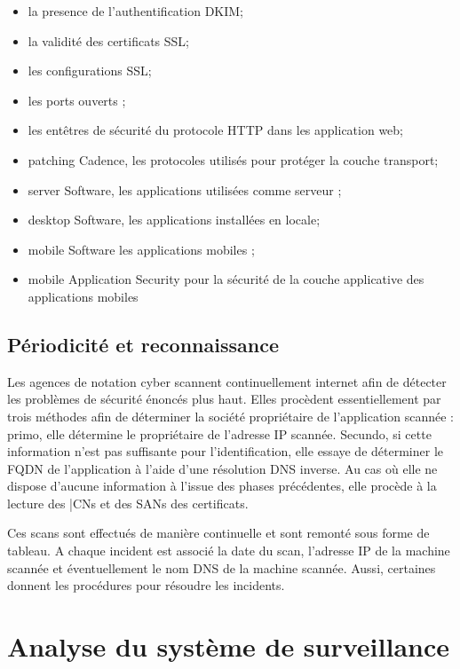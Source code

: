 \documentclass[a4paper,12pt]{book}
\theoremstyle{break}
\begin{document}
\begin{description}
\begin{itemize}
        \item la presence de l’authentification DKIM;
        \item la validité des certificats SSL;
        \item les configurations SSL;
        \item les ports ouverts ;
        \item les entêtres de sécurité du protocole HTTP dans les application web;
        \item patching Cadence, les protocoles utilisés pour protéger la couche transport;
        \item server Software, les applications utilisées comme serveur ; 
        \item desktop Software, les applications installées en locale; 
        \item mobile Software les applications mobiles ; 
        \item mobile Application Security pour la sécurité de la couche applicative des applications mobiles 
   

    \end{itemize}
    
\end{description}

\subsection{Périodicité et reconnaissance}
Les agences de notation cyber scannent continuellement internet afin de détecter les problèmes de sécurité énoncés plus haut. Elles procèdent essentiellement par trois méthodes afin de déterminer la société propriétaire de l’application scannée : primo, elle détermine le propriétaire de l’adresse IP scannée. Secundo, si cette information n’est pas suffisante pour l’identification, elle essaye de déterminer le \ac{FQDN} de l’application à l’aide d’une résolution DNS inverse. Au cas où elle ne dispose d’aucune information à l’issue des phases précédentes, elle procède à la lecture des |\ac{CNs} et des \ac{SANs} des certificats. 


Ces scans sont effectués de manière continuelle et sont remonté sous forme de tableau. A chaque incident est associé la date du scan, l’adresse IP de la machine scannée et éventuellement le nom DNS de la machine scannée. Aussi, certaines donnent les procédures pour résoudre les incidents.


\section{Analyse du système de surveillance}
\end{document}
